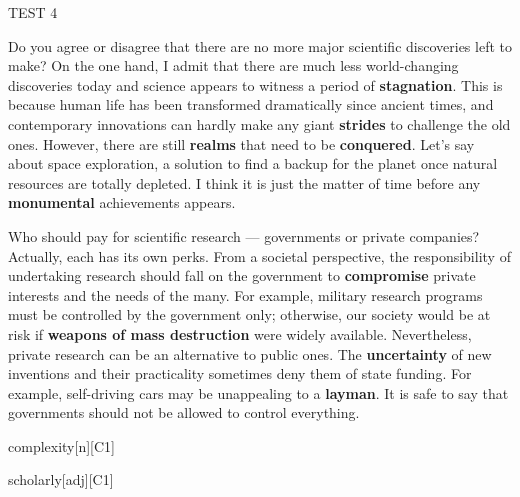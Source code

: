 \begin{glossarymc}[Cambridge 15]
\begin{test}{TEST 4}
    \begin{qa}{Do you agree or disagree that there are no more major scientific discoveries left to make?}
    On the one hand, I admit that there are much less world-changing discoveries today and science appears to witness a period of \textbf{stagnation}. This is because human life has been transformed dramatically since ancient times, and contemporary innovations can hardly make any giant \textbf{strides} to challenge the old ones. However, there are still \textbf{realms} that need to be \textbf{conquered}. Let’s say about space exploration, a solution to find a backup for the planet once natural resources are totally depleted. I think it is just the matter of time before any \textbf{monumental} achievements appears.
    \end{qa}

    \begin{qa}{Who should pay for scientific research — governments or private companies?}
    Actually, each has its own perks. From a societal perspective, the responsibility of undertaking research should fall on the government to \textbf{compromise} private interests and the needs of the many. For example, military research programs must be controlled by the government only; otherwise, our society would be at risk if \textbf{weapons of mass destruction} were widely available. Nevertheless, private research can be an alternative to public ones. The \textbf{uncertainty} of new inventions and their practicality sometimes deny them of state funding. For example, self-driving cars may be unappealing to a \textbf{layman}. It is safe to say that governments should not be allowed to control everything.
    \end{qa}

        \begin{VocabExplain}[Part 3]
            \begin{ExplainCard}{complexity}[n][C1]
            \end{ExplainCard}

            \begin{ExplainCard}{scholarly}[adj][C1]
            \end{ExplainCard}


\end{VocabExplain}
\end{test}
\end{glossarymc}
